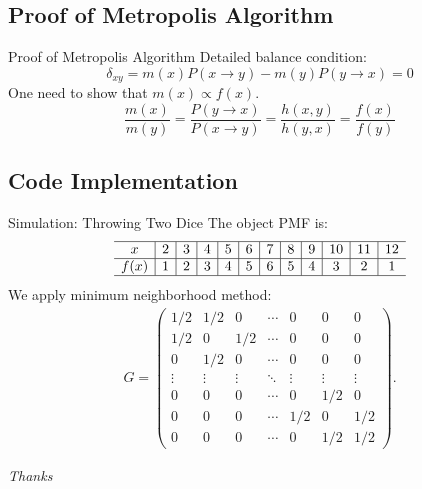 \subsection{Proof of Metropolis Algorithm}

\begin{frame}{Proof of Metropolis Algorithm}
    Detailed balance condition:
    \[\delta_{xy} = m(x)P(x\to y) - m(y)P(y\to x) = 0 \]
    One need to show that \(m(x) \varpropto f(x)\).
    \[\frac{m(x)}{m(y)} = \frac{P(y\to x)}{P(x\to y)} = \frac{h(x,y)}{h(y,x)} = \frac{f(x)}{f(y)}\]

\end{frame}
\subsection{Code Implementation}
\begin{frame}{Simulation: Throwing Two Dice}
    The object PMF is:
    \begin{align*}
        \begin{array}{c|c|c|c|c|c|c|c|c|c|c|c}
            \hline x & 2 & 3 & 4 & 5 & 6 & 7 & 8 & 9 & 10 & 11 & 12 \\
            \hline f(x) & 1 & 2 & 3 & 4 & 5 & 6 & 5 & 4 & 3 & 2 & 1 \\
            \hline
        \end{array}
    \end{align*}
    We apply minimum neighborhood method:
    \begin{align*}
        G=\left(\begin{array}{ccccccc}
            1 / 2 & 1 / 2 & 0 & \cdots & 0 & 0 & 0 \\
            1 / 2 & 0 & 1 / 2 & \cdots & 0 & 0 & 0 \\
            0 & 1 / 2 & 0 & \cdots & 0 & 0 & 0 \\
            \vdots & \vdots & \vdots & \ddots & \vdots & \vdots & \vdots \\
            0 & 0 & 0 & \cdots & 0 & 1 / 2 & 0 \\
            0 & 0 & 0 & \cdots & 1 / 2 & 0 & 1 / 2 \\
            0 & 0 & 0 & \cdots & 0 & 1 / 2 & 1 / 2
            \end{array}\right) .
    \end{align*}

\end{frame}






\begin{frame}
    \centering \Huge
    \emph{Thanks}
\end{frame}